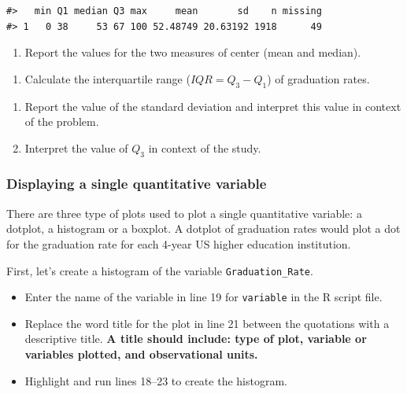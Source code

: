 \documentclass[
]{report}
\providecommand{\tightlist}{%
  \setlength{\itemsep}{0pt}\setlength{\parskip}{0pt}}
\begin{document}
\begin{verbatim}
#>   min Q1 median Q3 max     mean       sd    n missing
#> 1   0 38     53 67 100 52.48749 20.63192 1918      49
\end{verbatim}

\begin{enumerate}
\def\labelenumi{\arabic{enumi}.}
\setcounter{enumi}{1}
\tightlist
\item
  Report the values for the two measures of center (mean and median).
\end{enumerate}

\vspace{0.5in}

\begin{enumerate}
\def\labelenumi{\arabic{enumi}.}
\setcounter{enumi}{2}
\tightlist
\item
  Calculate the interquartile range (\(IQR = Q_3 - Q_1\)) of graduation rates.
\end{enumerate}

\vspace{0.5in}

\begin{enumerate}
\def\labelenumi{\arabic{enumi}.}
\setcounter{enumi}{3}
\item
  Report the value of the standard deviation and interpret this value in context of the problem.
  \vspace{0.8in}
\item
  Interpret the value of \(Q_3\) in context of the study.
\end{enumerate}

\vspace{0.8in}

\subsubsection*{Displaying a single quantitative variable}\label{displaying-a-single-quantitative-variable}

There are three type of plots used to plot a single quantitative variable: a dotplot, a histogram or a boxplot. A dotplot of graduation rates would plot a dot for the graduation rate for each 4-year US higher education institution.

First, let's create a histogram of the variable \texttt{Graduation\_Rate}.

\begin{itemize}
\item
  Enter the name of the variable in line 19 for \texttt{variable} in the R script file.
\item
  Replace the word title for the plot in line 21 between the quotations with a descriptive title. \textbf{A title should include: type of plot, variable or variables plotted, and observational units.}
\item
  Highlight and run lines 18--23 to create the histogram.
\end{itemize}
\end{document}
